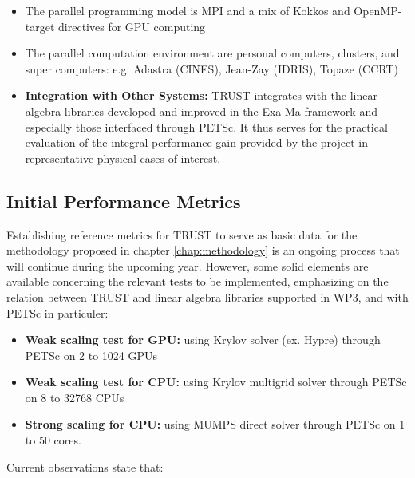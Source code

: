 \begin{itemize}
    \item The parallel programming model is MPI and a mix of Kokkos and OpenMP-target directives for GPU computing  
    \item The parallel computation environment are personal computers, clusters, and super computers: e.g. Adastra (CINES), Jean-Zay (IDRIS), Topaze (CCRT)
    \item \textbf{Integration with Other Systems:} TRUST integrates with the linear algebra libraries developed and improved in the Exa-Ma framework and especially those interfaced through PETSc. It thus serves for the practical evaluation of the integral performance gain provided by the project in representative physical cases of interest.
\end{itemize}


\subsection{Initial Performance Metrics}
\label{sec:WP3:TRUST Platform:metrics}

Establishing reference metrics for TRUST to serve as basic data for the methodology proposed in chapter \ref{chap:methodology} is an ongoing process that will continue during the upcoming year. However, some solid elements are available concerning the relevant tests to be implemented, emphasizing on the relation between TRUST and linear algebra libraries supported in WP3, and with PETSc in particuler:

\begin{itemize}
    \item \textbf{Weak scaling test for GPU: } using Krylov solver (ex. Hypre) through PETSc on 2 to 1024 GPUs
    \item\textbf{Weak scaling test for CPU: } using Krylov multigrid solver through PETSc on 8 to 32768 CPUs
    \item \textbf{Strong scaling for CPU: } using MUMPS direct solver through PETSc on 1 to 50 cores.
\end{itemize}

Current observations state that:

